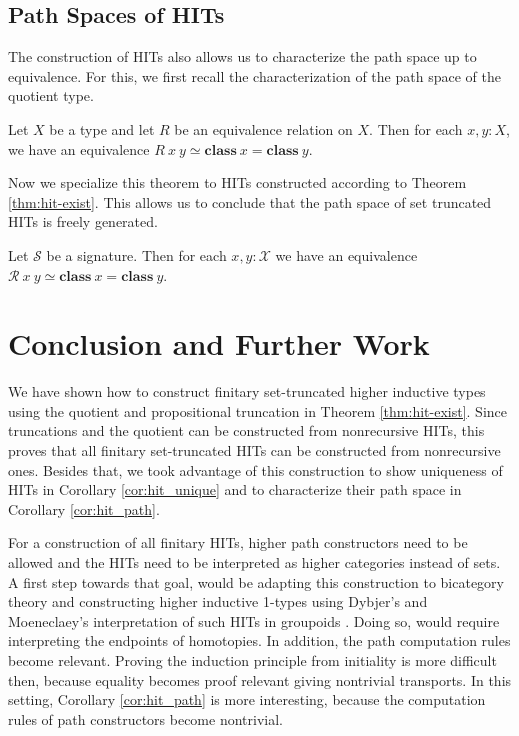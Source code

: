 \documentclass[9pt]{entcs}
\newcommand{\constructor}[1]{\mathbf{#1}}
\newcommand{\0}{\textbf{0}} %
\newcommand{\weq}{\simeq} %
\newcommand{\classof}{\constructor{class}} %
\newcommand{\sig}{\mathcal{S}} %
\newcommand{\CRC}{\mathcal{X}} %
\newcommand{\CRR}{\mathcal{R}} %
\begin{document}
\subsection{Path Spaces of HITs}
The construction of HITs also allows us to characterize the path space up to equivalence.
For this, we first recall the characterization of the path space of the quotient type.

\begin{proposition}
Let $X$ be a type and let $R$ be an equivalence relation on $X$.
Then for each $x, y : X$, we have an equivalence $R \> x \> y \weq \classof \> x = \classof \> y$.
\end{proposition}

Now we specialize this theorem to HITs constructed according to Theorem \ref{thm:hit-exist}.
This allows us to conclude that the path space of set truncated HITs is freely generated.

\begin{corollary}
\label{cor:hit_path}
Let $\sig$ be a signature.
Then for each $x, y : \CRC$ we have an equivalence $\CRR \> x \> y \weq \classof \> x = \classof \> y$.
\end{corollary}

\section{Conclusion and Further Work}
\label{sec:conclusion}
We have shown how to construct finitary set-truncated higher inductive types using the quotient and propositional truncation in Theorem \ref{thm:hit-exist}.
Since truncations and the quotient can be constructed from nonrecursive HITs, this proves that all finitary set-truncated HITs can be constructed from nonrecursive ones.
Besides that, we took advantage of this construction to show uniqueness of HITs in Corollary \ref{cor:hit_unique} and to characterize their path space in Corollary \ref{cor:hit_path}.

For a construction of all finitary HITs, higher path constructors need to be allowed and the HITs need to be interpreted as higher categories instead of sets.
A first step towards that goal, would be adapting this construction to bicategory theory \cite{ahrens2019bicategories,capriotti2017univalent} and constructing higher inductive 1-types using Dybjer's and Moeneclaey's interpretation of such HITs in groupoids \cite{DybjerM18}.
Doing so, would require interpreting the endpoints of homotopies.
In addition, the path computation rules become relevant.
Proving the induction principle from initiality is more difficult then, because equality becomes proof relevant giving nontrivial transports.
In this setting, Corollary \ref{cor:hit_path} is more interesting, because the computation rules of path constructors become nontrivial.
\end{document}
